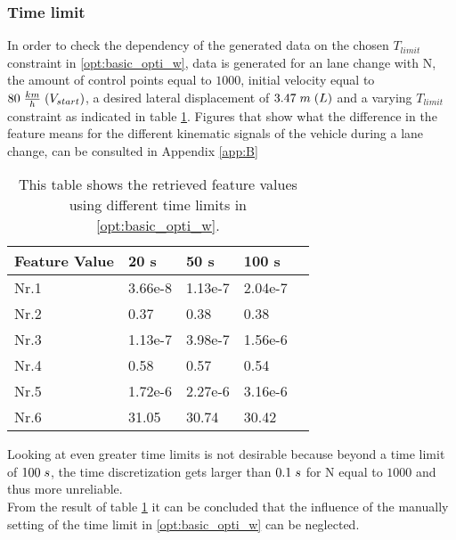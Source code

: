 \subsubsection{Time limit}
In order to check the dependency of the generated data on the chosen $T_{limit}$ constraint in \ref{opt:basic_opti_w}, data is generated for an lane change with N, the amount of control points equal to $1000$, initial velocity equal to $80 \hspace{1 mm} \frac{km}{h}\hspace{1mm}(V_{start})$, a desired lateral displacement of $3.47\hspace{1mm}m\hspace{1mm}(L)$ and a varying $T_{limit}$ constraint as indicated in table \ref{tab:GD_time_limit}. Figures that  show what the difference in the feature means for the different kinematic signals of the vehicle during a lane change, can be consulted in Appendix \ref{app:B}

\begin{table}[h!]
	\centering
	\begin{tabular}{@{}llllr@{}} \toprule
		\textbf{Feature Value}    & 20 s  & 50 s      & 100 s\\ \midrule
		Nr.1       & 3.66e-8     & 1.13e-7   & 2.04e-7\\
		Nr.2       & 0.37        & 0.38      & 0.38\\
		Nr.3       & 1.13e-7     & 3.98e-7   & 1.56e-6 \\
		Nr.4       & 0.58        & 0.57      & 0.54\\
		Nr.5       & 1.72e-6     & 2.27e-6   & 3.16e-6\\
		Nr.6       & 31.05       & 30.74     & 30.42\\ \bottomrule
	\end{tabular}
	\caption{This table shows the retrieved feature values using different time limits in \ref{opt:basic_opti_w}.}
	\label{tab:GD_time_limit}
\end{table}
Looking at even greater time limits is not desirable because beyond a time limit of $100 \hspace{1mm}s$, the time discretization gets larger than $0.1\hspace{1mm}s$ for N equal to $1000$ and thus more unreliable.\\

From the result of table \ref{tab:GD_time_limit} it can be concluded that the influence of the manually setting of the time limit in \ref{opt:basic_opti_w} can be neglected. 




